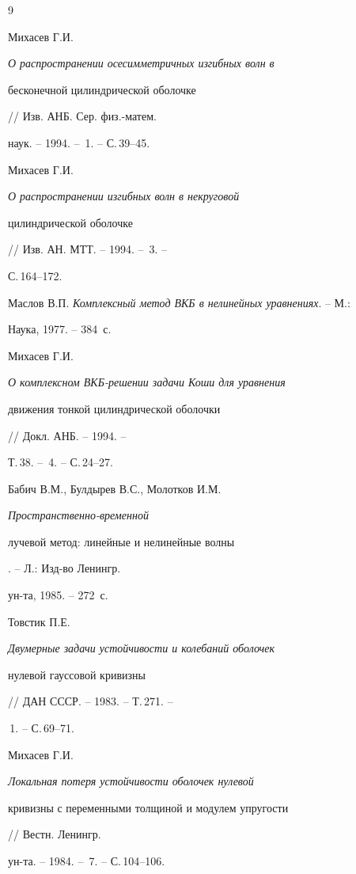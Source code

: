  


 


\begin{thebibliography}{9} 


 




Михасев Г.И. {\em О распространении осесимметричных изгибных волн в 


бесконечной цилиндрической оболочке} // Изв. АНБ. Сер. физ.-матем. 


наук. -- 1994. -- \No\,1. -- С.\,39--45. 




Михасев Г.И. {\em О распространении изгибных волн в некруговой 


цилиндрической оболочке} // Изв. АН. МТТ. -- 1994. -- \No\,3. -- 


С.\,164--172. 




Маслов В.П. {\em Комплексный метод ВКБ в нелинейных уравнениях}. -- М.: 


Наука, 1977. -- 384~с. 




Михасев Г.И. {\em О комплексном ВКБ-решении задачи Коши для уравнения 


движения тонкой цилиндрической оболочки} // Докл. АНБ. -- 1994. -- 


Т.\,38. -- \No\,4. -- С.\,24--27. 




Бабич В.М., Булдырев В.С., Молотков И.М. {\em Пространственно-временной 


лучевой метод: линейные и нелинейные волны}. -- Л.: Изд-во Ленингр. 


ун-та, 1985. -- 272~с. 




Товстик П.Е. {\em Двумерные задачи устойчивости и колебаний оболочек 


нулевой гауссовой кривизны} // ДАН СССР. -- 1983. -- Т.\,271. -- 


\No\,1. -- С.\,69--71. 




Михасев Г.И. {\em Локальная потеря устойчивости оболочек нулевой 


кривизны с переменными толщиной и модулем упругости} // Вестн. Ленингр. 


ун-та. -- 1984. -- \No\,7. -- С.\,104--106. 


 


\end{thebibliography} 


 


\vskip 2cm 


 






 


 


